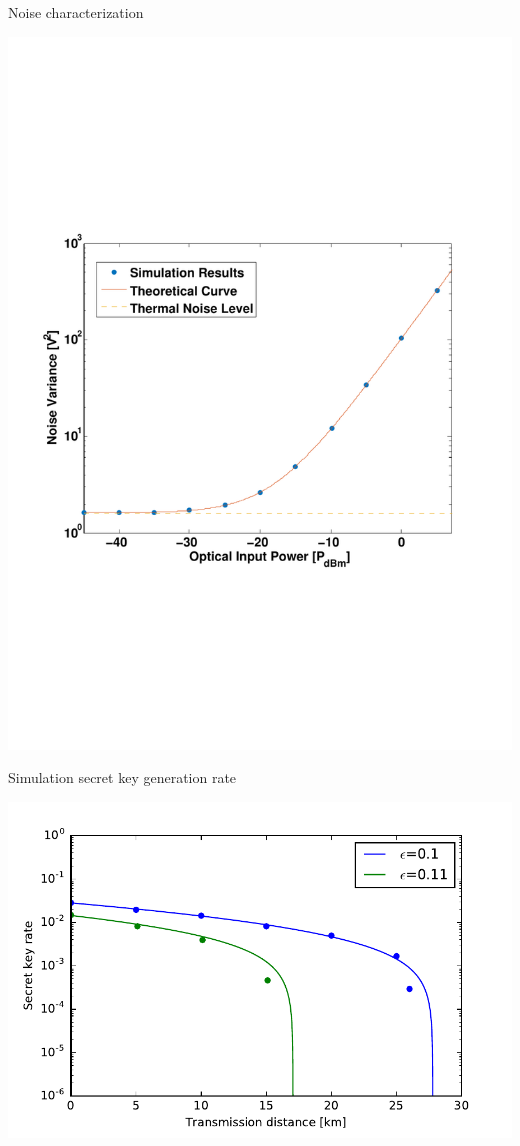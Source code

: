 \documentclass{beamer}
\begin{document}
\begin{frame}[t]{Noise characterization}
\begin{center}
\includegraphics[width=.5\linewidth, trim={1cm 7cm 1.5cm 7.5cm}, clip=true]{simucharact.pdf}
\end{center}
\end{frame}

\begin{frame}[t]{Simulation secret key generation rate}
\begin{center}
\includegraphics[width=.5\linewidth]{keyratesimulation.pdf}
\end{center}
\end{frame}

\end{document}
